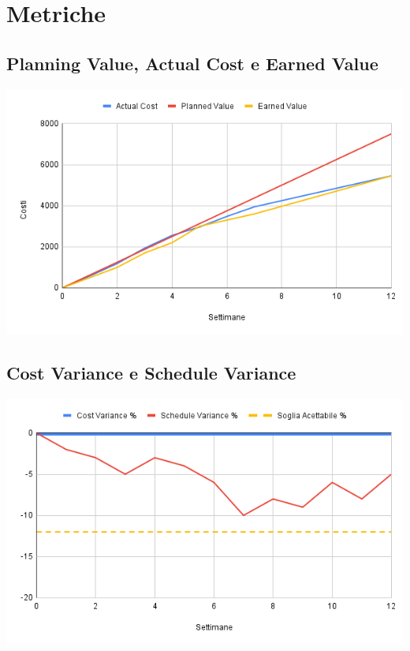 \documentclass[a4paper, 12pt]{article}
\begin{document}
\section{Metriche}
\subsection*{Planning Value, Actual Cost e Earned Value}
\begin{center}
	\includegraphics[scale=0.5]{AC_PV_EV.png}
\end{center}
\subsection*{Cost Variance e Schedule Variance}
\begin{center}
	\includegraphics[scale=0.5]{Cost_Variance_Schedule_Variance.png}
\end{center}
\end{document}
